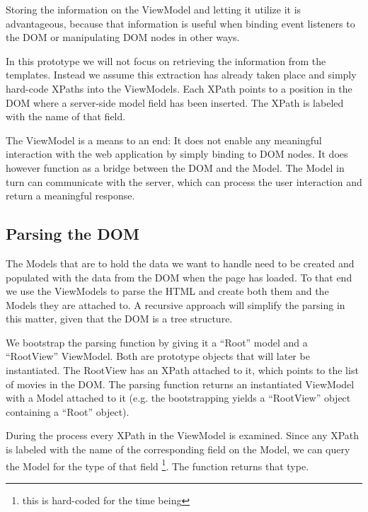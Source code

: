 \documentclass[thesis.tex]{subfiles}
\begin{document}
Storing the information on the ViewModel and letting it utilize it is
advantageous, because that information is useful when binding event listeners
to the DOM or manipulating DOM nodes in other ways.

In this prototype we will not focus on retrieving the information from
the templates. Instead we assume this extraction has already taken place and
simply hard-code XPaths into the ViewModels. Each XPath points to a
position in the DOM where a server-side model field has been inserted.
The XPath is labeled with the name of that field.

The ViewModel is a means to an end: It does not enable any meaningful
interaction with the web application by simply binding to DOM nodes.
It does however function as a bridge between the DOM and the Model.
The Model in turn can communicate with the server, which can process
the user interaction and return a meaningful response.

\subsection{Parsing the DOM}

The Models that are to hold the data we want to handle need to be created and
populated with the data from the DOM when the page has loaded.
To that end we use the ViewModels to parse the HTML and create both them and
the Models they are attached to.
A recursive approach will simplify the parsing in this matter,
given that the DOM is a tree structure.

We bootstrap the parsing function by giving it a ``Root'' model and
a ``RootView'' ViewModel.
Both are prototype objects that will later be instantiated.
The RootView has an XPath attached to it, which points to the list of movies
in the DOM. The parsing function returns an instantiated ViewModel with a Model
attached to it (e.g. the bootstrapping yields a ``RootView'' object containing
a ``Root'' object).

During the process every XPath in the ViewModel is examined.
Since any XPath is labeled with the name of the corresponding field on the
Model, we can query the Model for the type of that field
\footnote{this is hard-coded for the time being}.
The function  returns that type.
\end{document}
